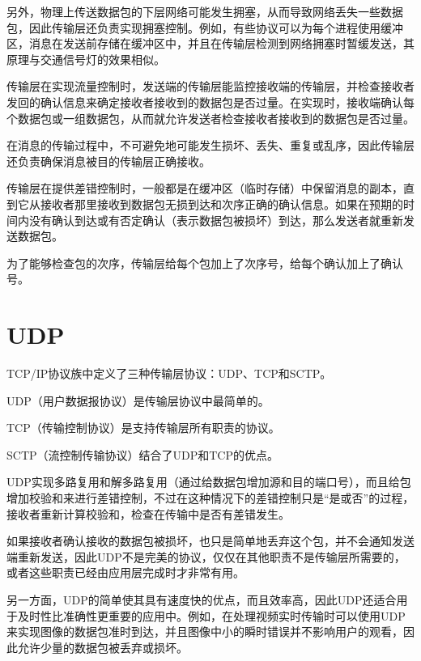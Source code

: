 另外，物理上传送数据包的下层网络可能发生拥塞，从而导致网络丢失一些数据包，因此传输层还负责实现拥塞控制。例如，有些协议可以为每个进程使用缓冲区，消息在发送前存储在缓冲区中，并且在传输层检测到网络拥塞时暂缓发送，其原理与交通信号灯的效果相似。


传输层在实现流量控制时，发送端的传输层能监控接收端的传输层，并检查接收者发回的确认信息来确定接收者接收到的数据包是否过量。在实现时，接收端确认每个数据包或一组数据包，从而就允许发送者检查接收者接收到的数据包是否过量。

在消息的传输过程中，不可避免地可能发生损坏、丢失、重复或乱序，因此传输层还负责确保消息被目的传输层正确接收。

传输层在提供差错控制时，一般都是在缓冲区（临时存储）中保留消息的副本，直到它从接收者那里接收到数据包无损到达和次序正确的确认信息。如果在预期的时间内没有确认到达或有否定确认（表示数据包被损坏）到达，那么发送者就重新发送数据包。

为了能够检查包的次序，传输层给每个包加上了次序号，给每个确认加上了确认号。


\section{UDP}


TCP/IP协议族中定义了三种传输层协议：UDP、TCP和SCTP。

\begin{compactitem}
\item UDP（用户数据报协议）是传输层协议中最简单的。
\item TCP（传输控制协议）是支持传输层所有职责的协议。
\item SCTP（流控制传输协议）结合了UDP和TCP的优点。
\end{compactitem}




UDP实现多路复用和解多路复用（通过给数据包增加源和目的端口号），而且给包增加校验和来进行差错控制，不过在这种情况下的差错控制只是“是或否”的过程，接收者重新计算校验和，检查在传输中是否有差错发生。

如果接收者确认接收的数据包被损坏，也只是简单地丢弃这个包，并不会通知发送端重新发送，因此UDP不是完美的协议，仅仅在其他职责不是传输层所需要的，或者这些职责已经由应用层完成时才非常有用。

另一方面，UDP的简单使其具有速度快的优点，而且效率高，因此UDP还适合用于及时性比准确性更重要的应用中。例如，在处理视频实时传输时可以使用UDP来实现图像的数据包准时到达，并且图像中小的瞬时错误并不影响用户的观看，因此允许少量的数据包被丢弃或损坏。

